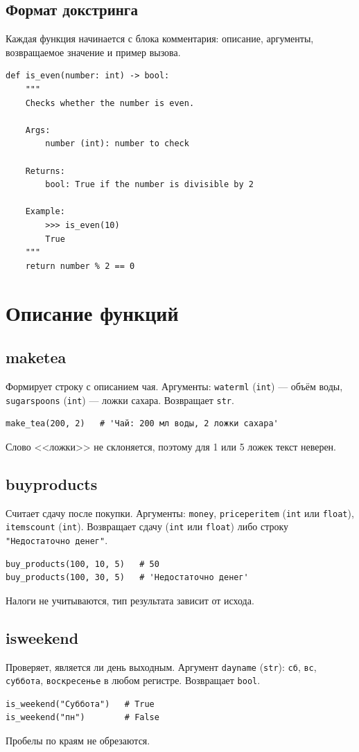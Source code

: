 \documentclass[a4paper,12pt]{article}
\renewcommand{\_}{\oldunderscore\allowbreak}
\begin{document}
\subsection{Формат докстринга}
Каждая функция начинается с блока комментария: описание, аргументы,
возвращаемое значение и пример вызова.

\begin{lstlisting}
def is_even(number: int) -> bool:
    """
    Checks whether the number is even.

    Args:
        number (int): number to check

    Returns:
        bool: True if the number is divisible by 2

    Example:
        >>> is_even(10)
        True
    """
    return number % 2 == 0
\end{lstlisting}

\section{Описание функций}

\subsection{make\_tea}
Формирует строку с описанием чая. Аргументы: \texttt{water\_ml} (\texttt{int}) --- объём воды,
\texttt{sugar\_spoons} (\texttt{int}) --- ложки сахара. Возвращает \texttt{str}.
\begin{Verbatim}
make_tea(200, 2)   # 'Чай: 200 мл воды, 2 ложки сахара'
\end{Verbatim}
Слово <<ложки>> не склоняется, поэтому для 1 или 5 ложек текст неверен.

\subsection{buy\_products}
Считает сдачу после покупки. Аргументы: \texttt{money}, \texttt{price\_per\_item}
(\texttt{int} или \texttt{float}), \texttt{items\_count} (\texttt{int}).
Возвращает сдачу (\texttt{int} или \texttt{float}) либо строку \texttt{"Недостаточно денег"}.
\begin{Verbatim}
buy_products(100, 10, 5)   # 50
buy_products(100, 30, 5)   # 'Недостаточно денег'
\end{Verbatim}
Налоги не учитываются, тип результата зависит от исхода.

\subsection{is\_weekend}
Проверяет, является ли день выходным. Аргумент \texttt{day\_name} (\texttt{str}):
\texttt{сб}, \texttt{вс}, \texttt{суббота}, \texttt{воскресенье} в любом регистре.
Возвращает \texttt{bool}.
\begin{Verbatim}
is_weekend("Суббота")   # True
is_weekend("пн")        # False
\end{Verbatim}
Пробелы по краям не обрезаются.
\end{document}
